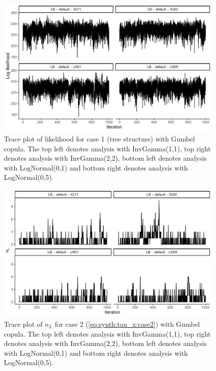 \documentclass{amsart}
\begin{document}
\begin{figure}
	\centering
	\includegraphics[width = 0.75\linewidth]{trace_case1_gumbel_like.pdf}
	\caption{Trace plot of likelihood for case 1 (tree structure) with Gumbel copula. The top left denotes analysis with InvGamma(1,1), top right denotes analysis with InvGamma(2,2), bottom left denotes analysis with LogNormal(0,1) and bottom right denotes analysis with LogNormal(0,5).}
	\label{fig:case1:gumbel:like}
\end{figure}

\begin{figure}
	\centering
	\includegraphics[width = 0.75\linewidth]{trace_case2_gumbel_nterm.pdf}
	\caption{Trace plot of $n_L$ for case 2 (\cref{eq:synth:tau_x:case2}) with Gumbel copula. The top left denotes analysis with InvGamma(1,1), top right denotes analysis with InvGamma(2,2), bottom left denotes analysis with LogNormal(0,1) and bottom right denotes analysis with LogNormal(0,5).}
	\label{fig:case2:gumbel:nterm}
\end{figure}
\end{document}

